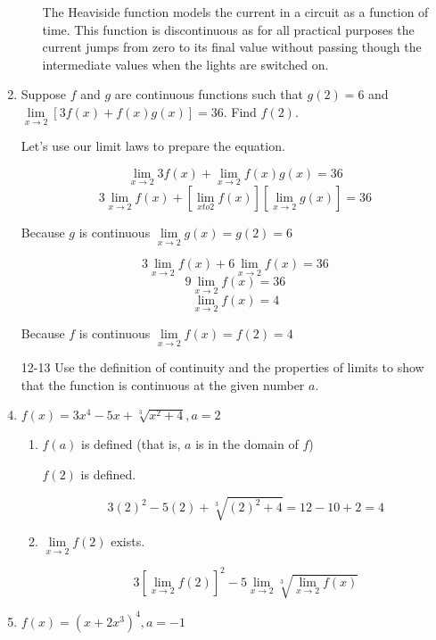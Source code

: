 \documentclass{article}
\begin{document}
\begin{enumerate}
\begin{enumerate}
					The Heaviside function models the current in a circuit as a function
					of time. This function is discontinuous as for all practical purposes
					the current jumps from zero to its final value without passing though
					the intermediate values when the lights are switched on.
			\end{enumerate}

			\item Suppose $f$ and $g$ are continuous functions such that $g(2) = 6$
				and $\lim \limits _{x \to 2} [3f(x) + f(x)g(x)] = 36$. Find $f(2)$.

				Let's use our limit laws to prepare the equation.

				$$\lim \limits _{x \to 2} 3f(x) + \lim \limits _{x \to 2} f(x)g(x) = 36$$
				$$3\lim \limits _{x \to 2} f(x) + [\lim \limits _{x to 2} f(x)][\lim \limits _{x \to 2} g(x)] = 36$$

				Because $g$ is continuous $\lim \limits _{x \to 2} g(x) = g(2) = 6$

				$$3\lim \limits _{x \to 2} f(x) + 6\lim \limits _{x \to 2} f(x) = 36$$
				$$9\lim \limits _{x \to 2} f(x) = 36$$
				$$\lim \limits _{x \to 2} f(x) = 4$$

				Because $f$ is continuous $\lim \limits_{x \to 2} f(x) = f(2) = 4$	

			\item[12-13] Use the definition of continuity and the properties of limits
					to show that the function is continuous at the given
					number $a$.

			\item $f(x) = 3x^4 - 5x +\sqrt[3]{x^2 + 4}, a = 2$

				\begin{enumerate}
					\item $f(a)$ is defined (that is, $a$ is in the domain of $f$)

					$f(2)$ is defined.

					$$3(2)^2 - 5(2) + \sqrt[3]{(2)^2 + 4} = 12 - 10 + 2 = 4$$

					\item $\lim \limits _{x \to 2} f(2)$ exists.

					$$3[\lim \limits _{x \to 2} f(2)]^2 - 5\lim \limits _{x \to 2} \sqrt[3]{\lim \limits _{x \to 2} f(x)}$$

				\end{enumerate}

			\item $f(x) = (x + 2x^3)^4, a = -1$


\end{enumerate}
\end{document}
